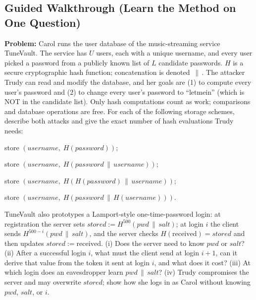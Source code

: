 \documentclass[12pt, a4paper]{article}
\begin{document}
\subsection*{Guided Walkthrough (Learn the Method on One Question)}
\textbf{Problem:} Carol runs the user database of the music-streaming service TuneVault. The service has $U$ users, each with a unique username, and every user picked a password from a publicly known list of $L$ candidate passwords. $H$ is a secure cryptographic hash function; concatenation is denoted $\,\|\,$. The attacker Trudy can read and modify the database, and her goals are (1) to compute every user's password and (2) to change every user's password to ``letmein'' (which is NOT in the candidate list). Only hash computations count as work; comparisons and database operations are free. For each of the following storage schemes, describe both attacks and give the exact number of hash evaluations Trudy needs:
\begin{tightitem}
\item[(a)] store $(username,\; H(password))$;
\item[(b)] store $(username,\; H(password \,\|\, username))$;
\item[(c)] store $(username,\; H(H(password) \,\|\, username))$;
\item[(d)] store $(username,\; H(password \,\|\, H(username)))$.
\end{tightitem}
TuneVault also prototypes a Lamport-style one-time-password login: at registration the server sets $stored := H^{500}(pwd \,\|\, salt)$; at login $i$ the client sends $H^{500-i}(pwd \,\|\, salt)$, and the server checks $H(\text{received}) = stored$ and then updates $stored := \text{received}$. (i) Does the server need to know $pwd$ or $salt$? (ii) After a successful login $i$, what must the client send at login $i+1$, can it derive that value from the token it sent at login $i$, and what does it cost? (iii) At which login does an eavesdropper learn $pwd \,\|\, salt$? (iv) Trudy compromises the server and may overwrite $stored$; show how she logs in as Carol without knowing $pwd$, $salt$, or $i$.
\end{document}
